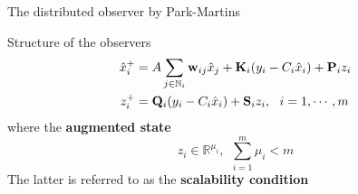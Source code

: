 \documentclass{beamer}
\newcommand{\R}{\mathbb{R}}
\begin{document}
\begin{frame}{\color{blue} The distributed observer by Park-Martins}

Structure of the observers
\begin{align*}
\hat{x}^{+}_{i}&=A\sum_{j\in\mathbb{N}_{i}} {\bf w}_{ij}\hat{x}_{j} + {\bf K}_{i}(y_{i}-C_{i}\hat{x}_{i})+ {\bf P}_{i}z_{i} \\
z^{+}_{i}&={\bf Q}_{i}(y_{i}-C_{i}\hat{x}_{i})+ {\bf S}_{i}z_{i},~~ i=1,\cdots,m
\end{align*}
where the \textbf{augmented state}
\begin{equation*}
z_{i}\in\R^{\mu_{i}},~~ \sum_{i=1}^{m}\mu_{i}<m
\end{equation*}
The latter is referred to as the \textbf{scalability condition}

\end{frame}
\end{document}
